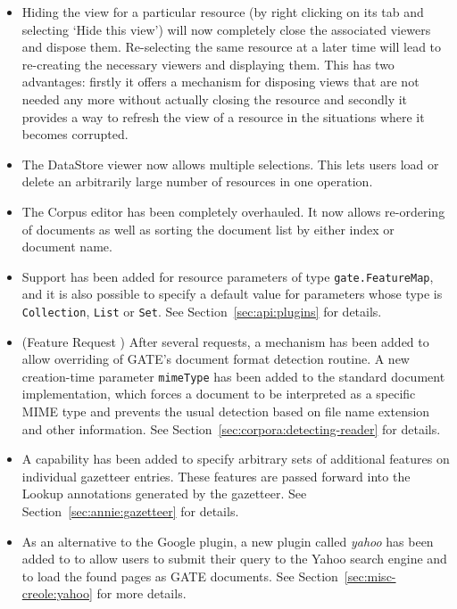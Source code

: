 \begin{itemize}

\item Hiding the view for a particular resource (by right clicking on its tab
and selecting `Hide this view') will now completely close the associated
viewers and dispose them. Re-selecting the same resource at a later time will
lead to re-creating the necessary viewers and displaying them. This has two
advantages: firstly it offers a mechanism for disposing views that are not
needed any more without actually closing the resource and secondly it provides
a way to refresh the view of a resource in the situations where it becomes
corrupted.

\item The DataStore viewer now allows multiple selections. This lets users load
or delete an arbitrarily large number of resources in one operation.

\item The Corpus editor has been completely overhauled. It now allows
re-ordering of documents as well as sorting the document list by either index
or document name.

\item Support has been added for resource parameters of type
  \texttt{gate.FeatureMap}, and it is also possible to specify a default value
  for parameters whose type is \texttt{Collection}, \texttt{List} or
  \texttt{Set}.  See Section~\ref{sec:api:plugins} for details.

\item (Feature Request
  )
  After several requests, a mechanism has been added to allow overriding of
  GATE's document format detection routine.  A new creation-time parameter
  {\tt mimeType} has been added to the standard document implementation, which
  forces a document to be interpreted as a specific MIME type and prevents the
  usual detection based on file name extension and other information.  See
  Section~\ref{sec:corpora:detecting-reader} for details.

\item A capability has been added to specify arbitrary sets of additional
  features on individual gazetteer entries.  These features are passed forward
  into the Lookup annotations generated by the gazetteer.  See
  Section~\ref{sec:annie:gazetteer} for details.

\item As an alternative to the Google plugin, a new plugin called
  \textit{yahoo} has been added to to allow users to submit their query to
  the Yahoo search engine and to load the found pages as GATE documents.  See
  Section~\ref{sec:misc-creole:yahoo} for more details.


\end{itemize}
